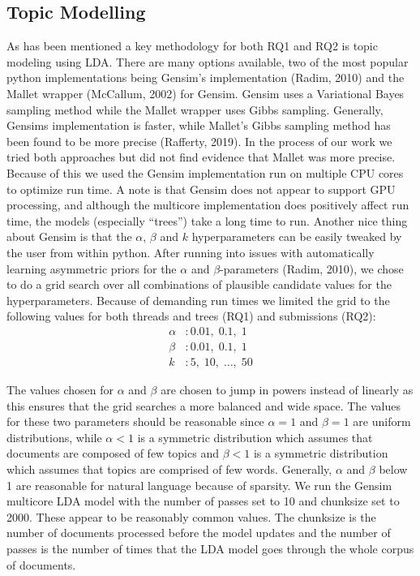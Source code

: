 \documentclass{article}
\begin{document}
    \subsection{Topic Modelling}
    As has been mentioned a key methodology for both RQ1 and RQ2 is topic modeling using LDA. There are many options available, two of the most popular python implementations being Gensim’s implementation (Radim, 2010) and the Mallet wrapper (McCallum, 2002) for Gensim. Gensim uses a Variational Bayes sampling method while the Mallet wrapper uses Gibbs sampling. Generally, Gensims implementation is faster, while Mallet’s Gibbs sampling method has been found to be more precise (Rafferty, 2019). In the process of our work we tried both approaches but did not find evidence that Mallet was more precise. Because of this we used the Gensim implementation run on multiple CPU cores to optimize run time. A note is that Gensim does not appear to support GPU processing, and although the multicore implementation does positively affect run time, the models (especially “trees”) take a long time to run. 
Another nice thing about Gensim is that the $\alpha$, $\beta$ and $k$ hyperparameters can be easily tweaked by the user from within python. After running into issues with automatically learning asymmetric priors for the $\alpha$ and $\beta$-parameters (Radim, 2010), we chose to do a grid search over all combinations of plausible candidate values for the hyperparameters. Because of demanding run times we limited the grid to the following values for both threads and trees (RQ1) and submissions (RQ2): 
\begin{align*} 
    \alpha&: 0.01,\; 0.1,\; 1\\
    \beta&: 0.01, \; 0.1, \; 1 \\
    k&: 5, \; 10, \; \ldots,\; 50     
\end{align*}

The values chosen for $\alpha$ and $\beta$ are chosen to jump in powers instead of linearly as this ensures that the grid searches a more balanced and wide space. The values for these two parameters should be reasonable since $\alpha = 1$ and $\beta = 1$ are uniform distributions, while $\alpha < 1$ is a symmetric distribution which assumes that documents are composed of few topics and $\beta < 1$ is a symmetric distribution which assumes that topics are comprised of few words. Generally, $\alpha$ and $\beta$ below 1 are reasonable for natural language because of sparsity. 
We run the Gensim multicore LDA model with the number of passes set to 10 and chunksize set to 2000. These appear to be reasonably common values. The chunksize is the number of documents processed before the model updates and the number of passes is the number of times that the LDA model goes through the whole corpus of documents.
\end{document}
